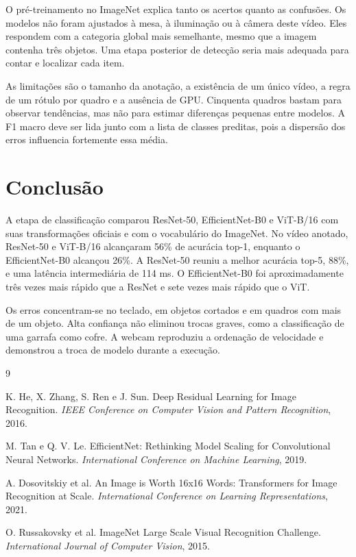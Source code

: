 \documentclass[12pt,a4paper]{article}
\begin{document}
O pré-treinamento no ImageNet explica tanto os acertos quanto as confusões. Os modelos
não foram ajustados à mesa, à iluminação ou à câmera deste vídeo. Eles respondem com a
categoria global mais semelhante, mesmo que a imagem contenha três objetos. Uma etapa
posterior de detecção seria mais adequada para contar e localizar cada item.

As limitações são o tamanho da anotação, a existência de um único vídeo, a regra de um
rótulo por quadro e a ausência de GPU. Cinquenta quadros bastam para observar tendências,
mas não para estimar diferenças pequenas entre modelos. A F1 macro deve ser lida junto
com a lista de classes preditas, pois a dispersão dos erros influencia fortemente essa média.

\section{Conclusão}

A etapa de classificação comparou ResNet-50, EfficientNet-B0 e ViT-B/16 com suas
transformações oficiais e com o vocabulário do ImageNet. No vídeo anotado, ResNet-50 e
ViT-B/16 alcançaram 56\% de acurácia top-1, enquanto o EfficientNet-B0 alcançou 26\%.
A ResNet-50 reuniu a melhor acurácia top-5, 88\%, e uma latência intermediária de
114 ms. O EfficientNet-B0 foi aproximadamente três vezes mais rápido que a ResNet e
sete vezes mais rápido que o ViT.

Os erros concentram-se no teclado, em objetos cortados e em quadros com mais de um
objeto. Alta confiança não eliminou trocas graves, como a classificação de uma garrafa
como cofre. A webcam reproduziu a ordenação de velocidade e demonstrou a troca de
modelo durante a execução.

\begin{thebibliography}{9}

K. He, X. Zhang, S. Ren e J. Sun.
\newblock Deep Residual Learning for Image Recognition.
\newblock \emph{IEEE Conference on Computer Vision and Pattern Recognition}, 2016.

M. Tan e Q. V. Le.
\newblock EfficientNet: Rethinking Model Scaling for Convolutional Neural Networks.
\newblock \emph{International Conference on Machine Learning}, 2019.

A. Dosovitskiy et al.
\newblock An Image is Worth 16x16 Words: Transformers for Image Recognition at Scale.
\newblock \emph{International Conference on Learning Representations}, 2021.

O. Russakovsky et al.
\newblock ImageNet Large Scale Visual Recognition Challenge.
\newblock \emph{International Journal of Computer Vision}, 2015.

\end{thebibliography}
\end{document}
